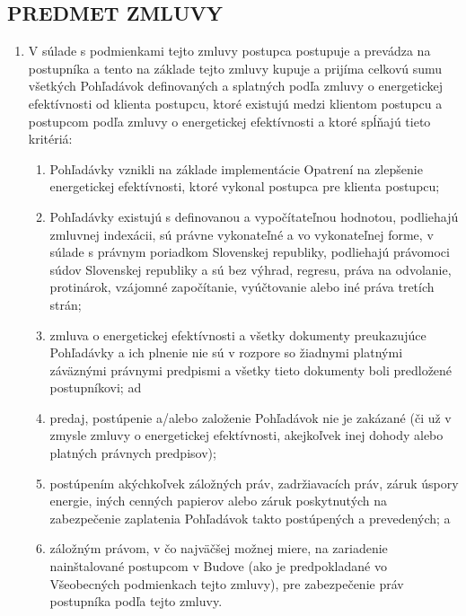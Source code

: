 \documentclass[a4paper]{article}
\begin{document}
\vspace{5mm}

\subsection{PREDMET ZMLUVY }

\vspace{2mm}

\begin{enumerate}
\item{V súlade s podmienkami tejto zmluvy postupca postupuje a prevádza na postupníka a tento na základe tejto zmluvy kupuje a prijíma celkovú sumu všetkých Pohľadávok definovaných a splatných podľa zmluvy o energetickej efektívnosti od klienta postupcu, ktoré existujú medzi klientom postupcu a postupcom podľa zmluvy o energetickej efektívnosti a ktoré spĺňajú tieto kritériá: }

  \begin{enumerate}
  \item{Pohľadávky vznikli na základe implementácie Opatrení na zlepšenie energetickej efektívnosti, ktoré vykonal postupca pre klienta postupcu;}

  \item{Pohľadávky existujú s definovanou a vypočítateľnou hodnotou, podliehajú zmluvnej indexácii, sú právne vykonateľné a vo vykonateľnej forme, v súlade s právnym poriadkom Slovenskej republiky, podliehajú právomoci súdov Slovenskej republiky a sú bez výhrad, regresu, práva na odvolanie, protinárok, vzájomné započítanie, vyúčtovanie alebo iné práva tretích strán;}

  \item{zmluva o energetickej efektívnosti a všetky dokumenty preukazujúce Pohľadávky a ich plnenie nie sú v rozpore so žiadnymi platnými záväznými právnymi predpismi a všetky tieto dokumenty boli predložené postupníkovi; ad}

  \item{predaj, postúpenie a/alebo založenie Pohľadávok nie je zakázané (či už v zmysle zmluvy o energetickej efektívnosti, akejkoľvek inej dohody alebo platných právnych predpisov); }

  \item{postúpením akýchkoľvek záložných práv, zadržiavacích práv, záruk úspory energie, iných cenných papierov alebo záruk poskytnutých na zabezpečenie zaplatenia Pohľadávok takto postúpených a prevedených; a  }

  \item{záložným právom, v čo najväčšej možnej miere, na zariadenie nainštalované postupcom v Budove (ako je predpokladané vo Všeobecných podmienkach tejto zmluvy), pre zabezpečenie práv postupníka podľa tejto zmluvy.}
  \end{enumerate}


\end{enumerate}
\end{document}
